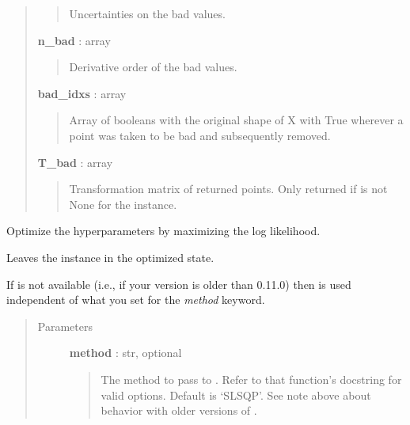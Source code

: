 \documentclass[letterpaper,10pt,english]{sphinxmanual}
\begin{document}
\begin{fulllineitems}
\begin{fulllineitems}
\begin{quote}
\begin{description}
\begin{quote}
Uncertainties on the bad values.
\end{quote}

\textbf{n\_bad} : array
\begin{quote}

Derivative order of the bad values.
\end{quote}

\textbf{bad\_idxs} : array
\begin{quote}

Array of booleans with the original shape of X with True wherever
a point was taken to be bad and subsequently removed.
\end{quote}

\textbf{T\_bad} : array
\begin{quote}

Transformation matrix of returned points. Only returned if
 is not None for the instance.
\end{quote}

\end{description}\end{quote}

\end{fulllineitems}


\begin{fulllineitems}
\label{gptools:gptools.gaussian_process.GaussianProcess.optimize_hyperparameters}
Optimize the hyperparameters by maximizing the log likelihood.

Leaves the {\hyperref[gptools:gptools.gaussian_process.GaussianProcess]{}} instance in the optimized state.

If  is not available (i.e., if your
 version is older than 0.11.0) then 
is used independent of what you set for the \emph{method} keyword.
\begin{quote}\begin{description}
\item[{Parameters}] \leavevmode
\textbf{method} : str, optional
\begin{quote}

The method to pass to .
Refer to that function's docstring for valid options. Default
is `SLSQP'. See note above about behavior with older versions of
.
\end{quote}


\end{description}
\end{quote}
\end{fulllineitems}
\end{fulllineitems}
\end{document}
